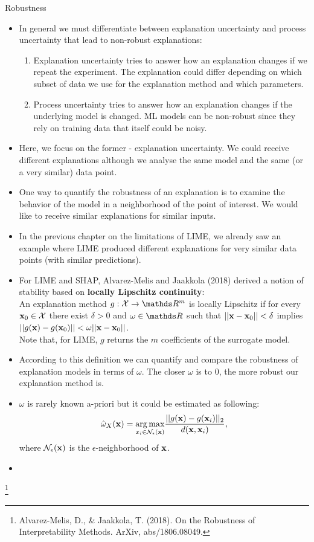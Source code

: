 \documentclass[11pt,compress,t,notes=noshow, xcolor=table]{beamer}
\begin{document}
\begin{vbframe}{Robustness}
		\begin{itemize}
		\item In general we must differentiate between explanation uncertainty and process uncertainty that lead to non-robust explanations: 
		\begin{enumerate}
			\item Explanation uncertainty tries to answer how an explanation changes if we repeat the experiment. The explanation could differ depending on which subset of data we use for the explanation method and which parameters. 
			\item Process uncertainty tries to answer how an explanation changes if the underlying model is changed. ML models can be non-robust since they rely on training data that itself could be noisy. 
		\end{enumerate}
		\item Here, we focus on the former - explanation uncertainty. We could receive different explanations although we analyse the same model and the same (or a very similar) data point.  
		\item One way to quantify the robustness of an explanation is to examine the behavior of the model in a neighborhood of the point of interest. We would like to receive similar explanations for similar inputs. 
		\item In the previous chapter on the limitations of LIME, we already saw an example where LIME produced different explanations for very similar data points (with similar predictions).
		\item For LIME and SHAP, Alvarez-Melis and Jaakkola (2018) derived a notion of stability based on \textbf{locally Lipschitz continuity}: \\
		An explanation method $g:\Xspace \rightarrow \R^m$ is locally Lipschitz if for every $\xv_0 \in \Xspace$ there exist $\delta > 0$ and $\omega \in \R$ such that $||\xv - \xv_0|| < \delta$ implies $||g(\xv) - g(\xv_0)|| < \omega ||\xv - \xv_0||$. \\
		\footnotesize Note that, for LIME, $g$ returns the $m$ coefficients of the surrogate model. \normalsize
		\item According to this definition we can quantify and compare the robustness of explanation models in terms of $\omega$. 
		The closer $\omega$ is to 0, the more robust our explanation method is. 
		\item $\omega$ is rarely known a-priori but it could be estimated as following: 
		$$\hat{\omega}_{X}(\xv) = \underset{x_i \in \mathcal{N}_{\epsilon}(\xv)}{\arg \max} \frac{||g(\xv) - g(\xv_i)||_2}{d(\xv, \xv_i)},$$
		where $\mathcal{N}_{\epsilon}(\xv)$ is the $\epsilon$-neighborhood of $\xv$.
		\item 
	\end{itemize}
\vspace{2cm}
\footnote[frame]{Alvarez-Melis, D., \& Jaakkola, T. (2018). On the Robustness of Interpretability Methods. ArXiv, abs/1806.08049.}
\end{vbframe}
\end{document}
